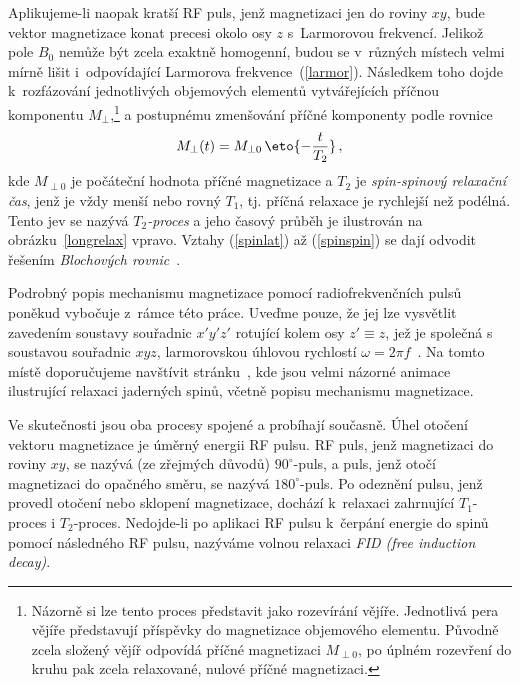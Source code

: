 Aplikujeme-li naopak kratší RF puls, jenž  magnetizaci jen do
roviny $xy$, bude vektor magnetizace konat precesi okolo osy $z$ s~Larmorovou
frekvencí. Jelikož pole $B_{0}$ nemůže být zcela exaktně homogenní, budou se
v~různých místech velmi mírně lišit i~odpovídající Larmorova
frekvence~(\ref{larmor}). Následkem toho dojde k~rozfázování jednotlivých
objemových elementů vytvářejících příčnou komponentu
$M_{\perp}$,\footnote{Názorně si lze tento proces představit jako rozevírání
  vějíře. Jednotlivá pera vějíře představují příspěvky do magnetizace
  objemového elementu. Původně zcela složený vějíř odpovídá příčné magnetizaci
  $M_{\perp0}$, po úplném rozevření do kruhu pak zcela relaxované, nulové
  příčné magnetizaci.} a postupnému zmenšování příčné komponenty podle rovnice
\begin{equation}
  M_{\perp}(t) = M_{\perp0}\,\eto{-\frac{t}{T_{2}}}\,,    \label{spinspin}
\end{equation}
kde $M_{\perp0}$ je počáteční hodnota příčné magnetizace a $T_{2}$ je
\emph{spin-spinový relaxační čas}, jenž je vždy menší nebo rovný $T_{1}$, tj.
příčná relaxace je rychlejší než podélná. Tento jev se nazývá
\emph{$T_{2}$-proces} a jeho časový průběh je ilustrován na
obrázku~\ref{longrelax} vpravo.  Vztahy (\ref{spinlat}) až (\ref{spinspin}) se
dají odvodit řešením \emph{Blochových rovnic}~\cite{Hor:LIVE:BasicsMRI:}.

Podrobný popis mechanismu  magnetizace pomocí
ra\-dio\-fre\-k\-venč\-ních pulsů poněkud vybočuje z~rámce této práce. Uveďme
pouze, že jej lze vysvětlit zavedením soustavy souřadnic $x'y'z'$ rotující
kolem osy $z'\equiv z$, jež je společná s~ soustavou souřadnic
$xyz$, larmorovskou úhlovou rychlostí $\omega = 2\pi
f$~\cite{Eng:1995:POKMF:}.  Na tomto místě doporučujeme navštívit
stránku~\cite{Hor:LIVE:BasicsMRI:}, kde jsou velmi názorné animace ilustrující
relaxaci jaderných spinů, včetně popisu mechanismu  magnetizace.

Ve skutečnosti jsou oba procesy spojené a probíhají současně. Úhel otočení
vektoru magnetizace je úměrný energii RF pulsu. RF puls, jenž 
magnetizaci do roviny $xy$, se nazývá (ze zřejmých důvodů) $90^{\circ}$-puls,
a puls, jenž otočí magnetizaci do opačného směru, se nazývá
$180^{\circ}$-puls. Po odeznění pulsu, jenž provedl otočení nebo sklopení
magnetizace, dochází k~relaxaci zahrnující $T_{1}$-proces i $T_{2}$-proces.
Nedojde-li po aplikaci RF pulsu k~čerpání energie do spinů pomocí následného
RF pulsu, nazýváme volnou relaxaci \emph{FID (free induction decay)}.

